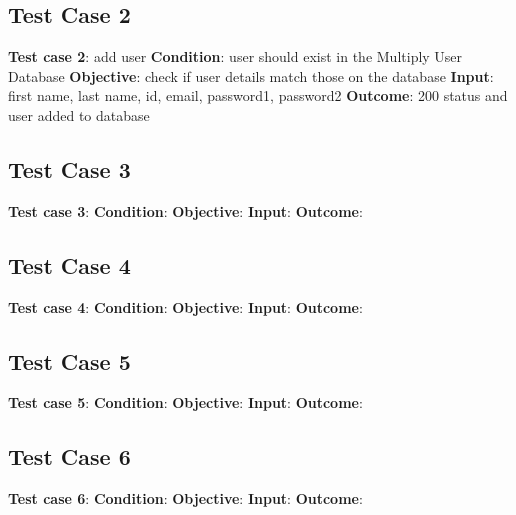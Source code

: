 \documentclass[11pt]{article}
\begin{document}
\subsection{Test Case 2}
\textbf{Test case 2}: add user \newline
\textbf{Condition}:  user should exist in the Multiply User Database \newline
\textbf{Objective}: check if user details match those on the database\newline
\textbf{Input}: first name, last name, id, email, password1, password2 \newline
\textbf{Outcome}: 200 status and user added to database \newline

\subsection{Test Case 3}
\textbf{Test case 3}:  \newline
\textbf{Condition}:  \newline
\textbf{Objective}:   \newline
\textbf{Input}:  \newline
\textbf{Outcome}:   \newline

\subsection{Test Case 4}
\textbf{Test case 4}:  \newline
\textbf{Condition}:  \newline
\textbf{Objective}:   \newline
\textbf{Input}:  \newline
\textbf{Outcome}:   \newline

\subsection{Test Case 5}
\textbf{Test case 5}:  \newline
\textbf{Condition}:  \newline
\textbf{Objective}:   \newline
\textbf{Input}:  \newline
\textbf{Outcome}:   \newline

\subsection{Test Case 6}
\textbf{Test case 6}:  \newline
\textbf{Condition}:  \newline
\textbf{Objective}:   \newline
\textbf{Input}:  \newline
\textbf{Outcome}:   \newline
\end{document}
